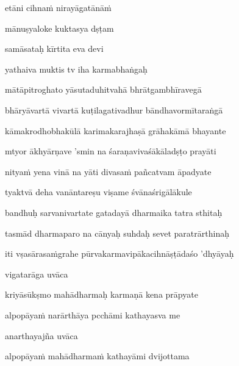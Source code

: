 \nemslokac 
etāni cihnaṁ nirayāgatānāṁ
\dontdisplaylinenum

\nemslokad 
mānuṣyaloke kuktasya dṣṭam \veg\dontdisplaylinenum

\vers

samāsataḥ kīrtita eva devi\thinspace{\dandab} \dontdisplaylinenum

yathaiva muktis tv iha karmabhaṅgaḥ \veg\dontdisplaylinenum

\ujvers\nemsloka 
mātāpitroghato yāsutaduhitvahā bhrātgambhīravegā
\dontdisplaylinenum

\nemslokab 
bhāryāvartā vivartā kuṭilagativadhur bāndhavormītaraṅgā \danda\dontdisplaylinenum

\nemslokac 
kāmakrodhobhakūlā karimakarajhaṣā grāhakāmā bhayante
\dontdisplaylinenum

\nemslokad 
mtyor ākhyārṇave 'smin na śaraṇavivaśākāladṣṭo prayāti \veg\dontdisplaylinenum

\ujvers\nemsloka 
nityaṁ yena vinā na yāti divasaṁ pañcatvam āpadyate
\dontdisplaylinenum

\nemslokab 
tyaktvā deha vanāntareṣu viṣame śvānaśrigālākule \danda\dontdisplaylinenum

\nemslokac 
bandhuḥ sarvanivartate gatadayā dharmaika tatra sthitaḥ
\dontdisplaylinenum

\nemslokad 
tasmād dharmaparo na cānyaḥ suhdaḥ sevet paratrārthinaḥ \veg\dontdisplaylinenum

\vers


\jump
\begin{center}
\ketdanda iti vṣasārasaṁgrahe pūrvakarmavipākacihnāṣṭādaśo 'dhyāyaḥ\ketdanda
\end{center}
\dontdisplaylinenum\vers 

\vers
\bekveg\szamveg\vfill\phpspagebreak\szam\bek{}
\thispagestyle{empty}



\jump\jump
vigatarāga uvāca~{\dandab}\dontdisplaylinenum 

kriyāsūkṣmo mahādharmaḥ karmaṇā kena prāpyate\thinspace{\danda} \dontdisplaylinenum

alpopāyaṁ narārthāya pcchāmi kathayasva me \veg\dontdisplaylinenum

anarthayajña uvāca~{\dandab}\dontdisplaylinenum 

alpopāyaṁ mahādharmaṁ kathayāmi dvijottama\thinspace{\danda} \dontdisplaylinenum

